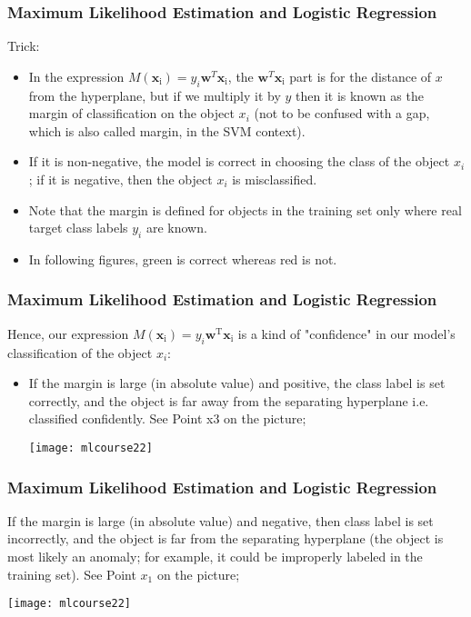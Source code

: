 \begin{frame}[fragile]\frametitle{Maximum Likelihood Estimation and Logistic Regression}
Trick:
 \begin{itemize}

\item In the expression $M(\textbf{x}_\text{i}) = y_i\textbf{w}^T\textbf{x}_\text{i}$, the $\textbf{w}^T\textbf{x}_\text{i}$ part is for the distance of $x$ from the hyperplane, but if we multiply it by $y$ then it is known as the margin of classification on the object $x_i$ (not to be confused with a gap, which is also called margin, in the SVM context). 
\item If it is non-negative, the model is correct in choosing the class of the object $x_i$; if it is negative, then the object $x_i$ is misclassified. 
\item Note that the margin is defined for objects in the training set only where real target class labels $y_i$ are known.
\item In following figures, green is correct whereas red is not.
\end{itemize}

\end{frame}



\begin{frame}[fragile]\frametitle{Maximum Likelihood Estimation and Logistic Regression}
Hence, our expression $M(\textbf{x}_\text{i}) = y_i\textbf{w}^\text{T}\textbf{x}_\text{i}$ is a kind of "confidence" in our model's classification of the object $x_i$:
 \begin{itemize}

\item If the margin is large (in absolute value) and positive, the class label is set correctly, and the object is far away from the separating hyperplane i.e. classified confidently. See Point x3 on the picture;

\begin{center}
\texttt{[image: mlcourse22]}
\end{center}


\end{itemize}

\end{frame}


\begin{frame}[fragile]\frametitle{Maximum Likelihood Estimation and Logistic Regression}
If the margin is large (in absolute value) and negative, then class label is set incorrectly, and the object is far from the separating hyperplane (the object is most likely an anomaly; for example, it could be improperly labeled in the training set). See Point $x_1$ on the picture;


\begin{center}
\texttt{[image: mlcourse22]}
\end{center}

\end{frame}


